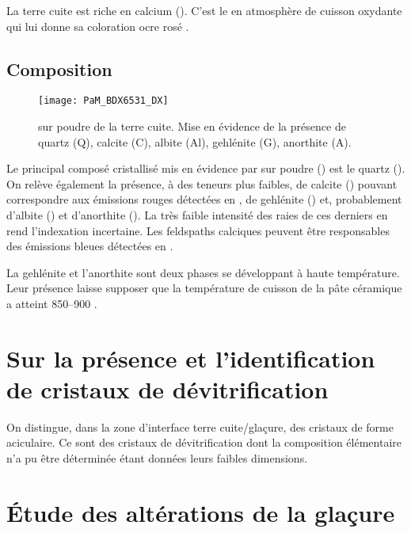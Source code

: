 La terre cuite est riche en calcium (). C'est 
le  en atmosphère de cuisson oxydante qui lui donne sa 
coloration ocre rosé \autocite{Echallier_1984}.

\subsection{Composition \cristallo}
\begin{figure}[htb]
  \texttt{[image: PaM\_BDX6531\_DX]}
  \caption[\ -- \DX sur poudre de la terre cuite]
          {\legendeA 
           \DX sur poudre de la terre cuite. 
           Mise en évidence de la présence de quartz (Q), calcite (C), 
           albite (Al), gehlénite (G), anorthite (A).}
  \label{DRX:6531}
\end{figure}

Le principal composé cristallisé mis en évidence par \DX sur poudre 
() est le quartz (\quartz). On relève également la 
présence, à des teneurs plus faibles, de calcite (\calcite) pouvant 
correspondre aux émissions rouges détectées en \CL, de gehlénite 
(\gehlenite) et, probablement d'albite (\albite) et d'anorthite 
(\anorthite). La très faible intensité des raies de ces derniers en 
rend l'indexation incertaine. Les feldspaths calciques peuvent être 
responsables des émissions bleues détectées en \CL.

La gehlénite et l'anorthite sont deux phases se développant à 
haute température. Leur présence laisse supposer que la température 
de cuisson de la pâte céramique a atteint 
\SIrange[range-phrase=\ à\ ]{850}{900}{\degC} \autocite{Peters_1978}.


\section{Sur la présence et l'identification de cristaux de 
         dévitrification}

On distingue, dans la zone d'interface terre cuite/glaçure, des 
cristaux de forme aciculaire. Ce sont des cristaux de dévitrification 
dont la composition élémentaire n'a pu être déterminée étant données 
leurs faibles dimensions.


\section{Étude des altérations de la glaçure}

